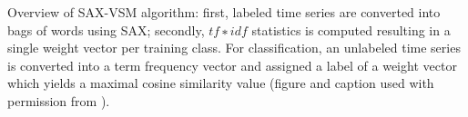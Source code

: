 Overview of SAX-VSM algorithm: first, labeled time series are converted into bags of words using SAX; secondly, $tf∗idf$ statistics is computed resulting in a single weight vector per training class. For classification, an unlabeled time series is converted into a term frequency vector and assigned a label of a weight vector which yields a maximal cosine similarity value (figure and caption used with permission from \cite{senin_sax-vsm:_2013}).
\label{fig:saxvsm_overview}